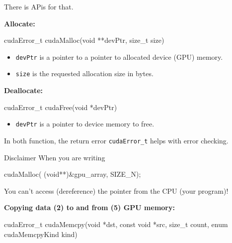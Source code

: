         There is APis for that.
        \begin{center}
        \begin{minipage}{0.45\textwidth}
        \textbf{Allocate:}
        \begin{codeCenter}
        \begin{Ccode}
cudaError_t cudaMalloc(void **devPtr, size_t size)
        \end{Ccode}
        \end{codeCenter}
        \begin{itemize}[left=10pt, label=\textbullet]
            \item \texttt{devPtr} is a pointer to a pointer to allocated device (GPU) memory. 
            \item \texttt{size} is the requested allocation size in bytes.
        \end{itemize}
\end{minipage}
        \hfill
        \begin{minipage}{0.45\textwidth}
        \textbf{Deallocate:}
        \begin{codeCenter}
        \begin{Ccode}
cudaError_t cudaFree(void *devPtr)
        \end{Ccode}
        \end{codeCenter}
        \begin{itemize}[left=10pt, label=\textbullet]
            \item \texttt{devPtr} is a pointer to device memory to free.
        \end{itemize}
        \end{minipage}
        \end{center}
        In both function, the return error \texttt{cudaError\_t} helps with error checking.\\
        \begin{remark}{Disclaimer}
       When you are writing 
        \begin{codeCenter}
        \begin{Ccode}
cudaMalloc( (void**)&gpu_array, SIZE_N);
        \end{Ccode}
        \end{codeCenter}
        You can't access (dereference) the pointer from the CPU (your program)!
        \end{remark}
        \textbf{Copying data (2) to and from (5) GPU memory:}
        \begin{codeCenter}
        \begin{Ccode}
cudaError_t cudaMemcpy(void *dst, const void *src, size_t count, enum cudaMemcpyKind kind)
        \end{Ccode}
        \end{codeCenter}
